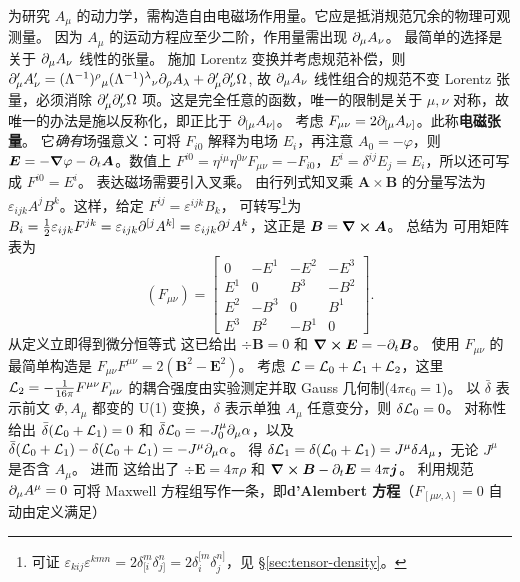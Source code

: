 为研究 $A_\mu$ 的动力学，需构造自由电磁场作用量。它应是抵消规范冗余的物理可观测量。
因为 $A_\mu$ 的运动方程应至少二阶，作用量需出现 $\partial_\mu A_\nu$。
最简单的选择是关于 $\partial_\mu A_\nu$ 线性的张量。
施加 Lorentz 变换并考虑规范补偿，则 $\partial'_\mu A'_\nu = (\Lambda^{-1})^{\rho}{}_{\mu} (\Lambda^{-1})^{\lambda}{}_{\nu} \partial_{\rho}A_{\lambda} + \partial'_{\mu}\partial'_{\nu}\Omega$,
故 $\partial_\mu A_\nu$ 线性组合的规范不变 Lorentz 张量，必须消除 $\partial'_{\mu}\partial'_{\nu}\Omega$ 项。这是完全任意的函数，唯一的限制是关于 $\mu,\nu$ 对称，故唯一的办法是施以反称化，即正比于 $\partial_{[\mu} A_{\nu]}$。
考虑 $F_{\mu\nu}=2\partial_{[\mu} A_{\nu]}$。此称\textbf{电磁张量}。
它\emph{确有}场强意义：可将 $F_{i0}$ 解释为电场 $E_i$，再注意 $A_0=-\varphi$，则 $\bm E=-\grad\varphi-\partial_t{\bm A}$。数值上 $F^{i0}=\eta^{i\mu}\eta^{0\nu}F_{\mu\nu}=-F_{i0}$，$E^i=\delta^{ij}E_j=E_i$，所以还可写成 $F^{i0}=E^i$。
表达磁场需要引入叉乘。
由行列式知叉乘 $\bm A\times \bm B$ 的分量写法为 $\varepsilon_{ijk} A^j B^k$。这样，给定 $F^{ij}=\varepsilon^{ijk}B_k$，
可转写\footnote{可证 $\varepsilon_{kij} \varepsilon^{kmn} =2\delta_{[i}^{m}\delta_{j]}^{n}=2\delta_{i}^{[m}\delta_{j}^{n]}$，见 \S\ref{sec:tensor-density}。}为 $B_i=\frac 12 \varepsilon_{ijk}F^{jk}=\varepsilon_{ijk}\partial^{[j}A^{k]}=\varepsilon_{ijk}\partial^j A^k$，这正是 $\bm B=\curl\bm A$。
总结为
可用矩阵表为
\[\left(F_{\mu\nu}\right)=\left[\begin{array}{cccc}0& -E^{1} & -E^{2} & -E^{3}\\E^{1} & 0 & B^{3} & -B^{2} \\E^{2} & -B^{3} & 0 & B^{1} \\E^{3} & B^{2} & -B^{1} & 0 \end{array}\right].\]
从定义立即得到微分恒等式
这已给出 $\div\bm B=0$ 和 $\curl\bm E=-\partial_t \bm B$。%
使用 $F_{\mu\nu}$ 的最简单构造是 $F_{\mu\nu} F^{\mu\nu}=2(\bm B^2-\bm E^2)$。
考虑 $\mathcal{L}= \mathcal{L}_0 + \mathcal{L}_1 + \mathcal{L}_2$，这里 $\mathcal{L}_2 = -\frac{1}{16\pi}F^{\mu\nu} F_{\mu\nu}$ 的耦合强度由实验测定并取 Gauss 几何制($4\pi\epsilon_0 = 1$)。
以 $\bar\delta$ 表示前文 $\Phi,A_\mu$ 都变的 U(1) 变换，$\delta$ 表示单独 $A_\mu$ 任意变分，则 $\delta\mathcal{L}_0=0$。
对称性给出 $\bar\delta(\mathcal{L}_0+\mathcal{L}_1) = 0$ 和 $\bar\delta\mathcal{L}_0 = -J_0^\mu\partial_\mu\alpha$，以及 $\bar\delta(\mathcal{L}_0+\mathcal{L}_1) - \delta(\mathcal{L}_0+\mathcal{L}_1) = -J^\mu\partial_\mu\alpha$。
得 $\delta\mathcal{L}_1=\delta(\mathcal{L}_0+\mathcal{L}_1)=J^\mu\delta A_\mu$，无论 $J^\mu$ 是否含 $A_\mu$。
进而
这给出了 $\div\bm E=4\pi \rho$ 和 $\curl\bm B-\partial_t \bm E=4\pi \bm j$。
利用规范 $\partial_\mu A^\mu=0$ 可将 Maxwell 方程组写作一条，即\textbf{d'Alembert 方程}（$F_{[\mu\nu,\lambda]}=0$ 自动由定义满足）

